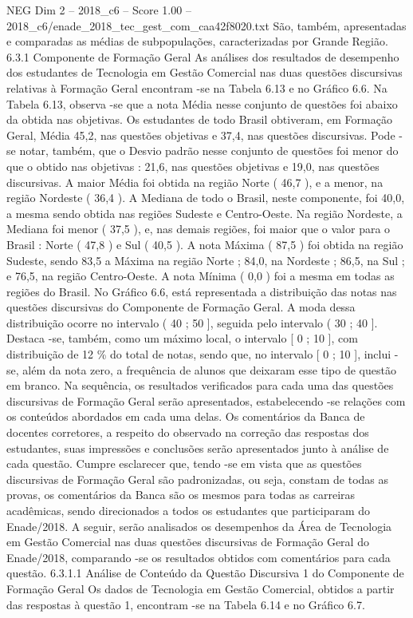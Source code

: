 \begin{textsample}{NEG Dim 2 – 2018\_c6 – Score 1.00 – 2018\_c6/enade\_2018\_tec\_gest\_com\_caa42f8020.txt}
São, também, apresentadas e comparadas as médias de subpopulações, caracterizadas por Grande Região. 6.3.1 Componente de Formação Geral As análises dos resultados de desempenho dos estudantes de Tecnologia em Gestão Comercial nas duas questões discursivas relativas à Formação Geral encontram -se na Tabela 6.13 e no Gráfico 6.6.
Na Tabela 6.13, observa -se que a nota Média nesse conjunto de questões foi abaixo da obtida nas objetivas.
Os estudantes de todo Brasil obtiveram, em Formação Geral, Média 45,2, nas questões objetivas e 37,4, nas questões discursivas.
Pode -se notar, também, que o Desvio padrão nesse conjunto de questões foi menor do que o obtido nas objetivas : 21,6, nas questões objetivas e 19,0, nas questões discursivas.
A maior Média foi obtida na região Norte ( 46,7 ), e a menor, na região Nordeste ( 36,4 ).
A Mediana de todo o Brasil, neste componente, foi 40,0, a mesma sendo obtida nas regiões Sudeste e Centro-Oeste.
Na região Nordeste, a Mediana foi menor ( 37,5 ), e, nas demais regiões, foi maior que o valor para o Brasil : Norte ( 47,8 ) e Sul ( 40,5 ).
A nota Máxima ( 87,5 ) foi obtida na região Sudeste, sendo 83,5 a Máxima na região Norte ; 84,0, na Nordeste ; 86,5, na Sul ; e 76,5, na região Centro-Oeste.
A nota Mínima ( 0,0 ) foi a mesma em todas as regiões do Brasil.
No Gráfico 6.6, está representada a distribuição das notas nas questões discursivas do Componente de Formação Geral.
A moda dessa distribuição ocorre no intervalo ( 40 ; 50 ], seguida pelo intervalo ( 30 ; 40 ].
Destaca -se, também, como um máximo local, o intervalo [ 0 ; 10 ], com distribuição de 12 \% do total de notas, sendo que, no intervalo [ 0 ; 10 ], inclui -se, além da nota zero, a frequência de alunos que deixaram esse tipo de questão em branco.
Na sequência, os resultados verificados para cada uma das questões discursivas de Formação Geral serão apresentados, estabelecendo -se relações com os conteúdos abordados em cada uma delas.
Os comentários da Banca de docentes corretores, a respeito do observado na correção das respostas dos estudantes, suas impressões e conclusões serão apresentados junto à análise de cada questão.
Cumpre esclarecer que, tendo -se em vista que as questões discursivas de Formação Geral são padronizadas, ou seja, constam de todas as provas, os comentários da Banca são os mesmos para todas as carreiras acadêmicas, sendo direcionados a todos os estudantes que participaram do Enade/2018.
A seguir, serão analisados os desempenhos da Área de Tecnologia em Gestão Comercial nas duas questões discursivas de Formação Geral do Enade/2018, comparando -se os resultados obtidos com comentários para cada questão. 6.3.1.1 Análise de Conteúdo da Questão Discursiva 1 do Componente de Formação Geral Os dados de Tecnologia em Gestão Comercial, obtidos a partir das respostas à questão 1, encontram -se na Tabela 6.14 e no Gráfico 6.7.

\end{textsample}
